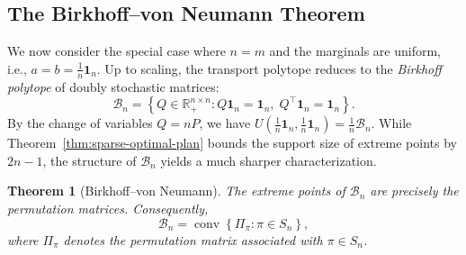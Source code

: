 \documentclass[11pt,a4paper]{article}
\newtheorem{theorem}{Theorem}[section]
\theoremstyle{definition}
\begin{document}
\subsection{The Birkhoff--von Neumann Theorem}

We now consider the special case where $n=m$ and the marginals are uniform, i.e.,
$a=b=\frac{1}{n}\mathbf{1}_n$. Up to scaling, the transport polytope reduces to
the \emph{Birkhoff polytope} of doubly stochastic matrices:
\[\mathcal{B}_n = \left\{Q\in\mathbb{R}_+^{n\times n}:Q\mathbf{1}_n=\mathbf{1}_n,
\; Q^\top\mathbf{1}_n=\mathbf{1}_n\right\}.\]
By the change of variables $Q = nP$, we have $U(\tfrac{1}{n}\mathbf{1}_n,
\tfrac{1}{n}\mathbf{1}_n)=\frac{1}{n}\mathcal{B}_n$.
While Theorem~\ref{thm:sparse-optimal-plan} bounds the support size of extreme points
by $2n-1$, the structure of $\mathcal{B}_n$ yields a much sharper characterization.

\begin{theorem}[Birkhoff--von Neumann]
\label{thm:birkhoff}
The extreme points of $\mathcal{B}_n$ are precisely the permutation matrices.
Consequently,
\[
\mathcal{B}_n
=\operatorname{conv}
\left\{\Pi_\pi:\pi\in S_n\right\},
\]
where $\Pi_\pi$ denotes the permutation matrix associated with $\pi\in S_n$.
\end{theorem}
\end{document}

